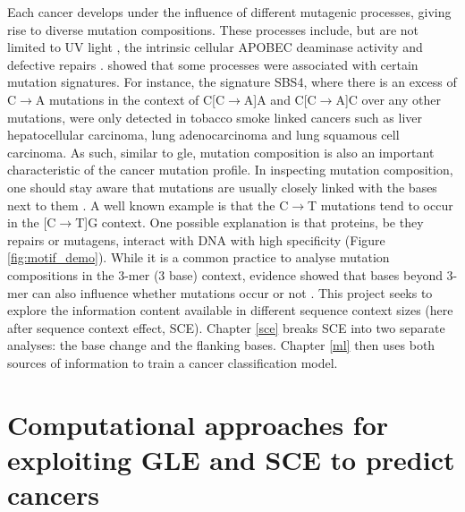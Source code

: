 Each cancer develops under the influence of different mutagenic processes, giving rise to diverse mutation compositions. These processes include, but are not limited to UV light \citep[known in skin melanoma;][]{Mohania2017}, the intrinsic cellular APOBEC deaminase activity \citep[\textit{e.g.} in B cells;][]{Kuppers2005MechanismsPathogenesis} and defective repairs \citep[\textit{e.g.} mutated \textit{BRCA} genes in breast cancer;][]{Navasardyan2021YY1TNBC}. \citet{Alexandrov2013, Alexandrov2020} showed that some processes were associated with certain mutation signatures. For instance, the signature SBS4, where there is an excess of C$\rightarrow$A mutations in the context of C[C$\rightarrow$A]A and C[C$\rightarrow$A]C over any other mutations, were only detected in tobacco smoke linked cancers such as liver hepatocellular carcinoma, lung adenocarcinoma and lung squamous cell carcinoma. As such, similar to \gls{gle}, mutation composition is also an important characteristic of the cancer mutation profile. In inspecting mutation composition, one should stay aware that mutations are usually closely linked with the \glspl{base} next to them \citep{Zhu2017}. A well known example is that the C$\rightarrow$T mutations tend to occur in the [C$\rightarrow$T]G context. One possible explanation is that proteins, be they repairs or mutagens, interact with DNA with high specificity (Figure \ref{fig:motif_demo}). While it is a common practice to analyse mutation compositions in the 3-mer (3 base) context, evidence showed that bases beyond 3-mer can also influence whether mutations occur or not \citep{Zhu2017,Zhu2020}. This project seeks to explore the information content available in different sequence context sizes (here after sequence context effect, SCE). Chapter \ref{sce} breaks SCE into two separate analyses: the base change and the flanking bases. Chapter \ref{ml} then uses both sources of information to train a cancer classification model.  



\section{Computational approaches for exploiting GLE and SCE to predict cancers}
\label{intro:ml}